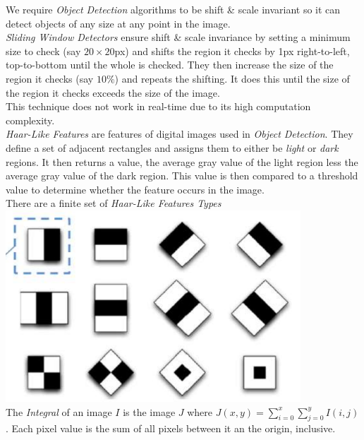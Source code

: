 \documentclass[11pt,a4paper]{article}
\begin{document}
We require \textit{Object Detection} algorithms to be shift \& scale invariant so it can detect objects of any size at any point in the image.\\

\textit{Sliding Window Detectors} ensure shift \& scale invariance by setting a minimum size to check (say $20\times20$px) and shifts the region it checks by 1px right-to-left, top-to-bottom until the whole is checked. They then increase the size of the region it checks (say $10\%$) and repeats the shifting. It does this until the size of the region it checks exceeds the size of the image.\\
\nb This technique does not work in real-time due to its high computation complexity.\\

\textit{Haar-Like Features} are features of digital images used in \textit{Object Detection}. They define a set of adjacent rectangles and assigns them to either be \textit{light} or \textit{dark} regions. It then returns a value, the average gray value of the light region less the average gray value of the dark region. This value is then compared to a threshold value to determine whether the feature occurs in the image.\\

There are a finite set of \textit{Haar-Like Features Types}\\
\includegraphics[scale=.6]{img/haar.png}\\

The \textit{Integral} of an image $I$ is the image $J$ where $J(x,y)=\sum_{i=0}^x\sum_{j=0}^yI(i,j)$. \ie Each pixel value is the sum of all pixels between it an the origin, inclusive.\\
\end{document}
